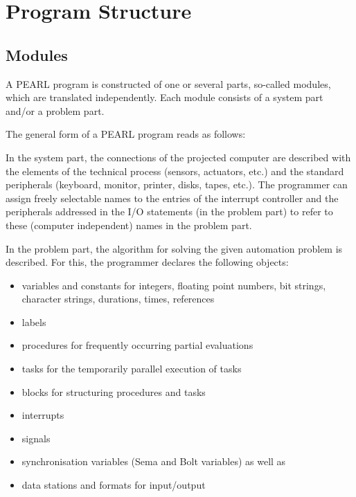 \chapter{Program Structure}   %

\section{Modules}  %
\label{sec_modules}

A PEARL program is constructed of one or several parts, so-called
modules, which are translated independently. Each module consists of a
system part and/or a problem part.

The general form of a PEARL program reads as follows:


\begin{grammarframe}



\end{grammarframe}

In the system part, the connections of the projected computer are
described with the elements of the technical process (sensors,
actuators, etc.) and the standard peripherals (keyboard, monitor,
printer, disks, tapes, etc.). The programmer can assign freely
selectable names to the entries of the interrupt controller and the
peripherals addressed in the I/O statements (in the problem part) to
refer to these (computer independent) names in the problem part.

In the problem part, the algorithm for solving the given automation
problem is described. For this, the programmer declares the following
objects:

\begin{itemize}
\item variables and constants for integers, floating point numbers, bit
strings, character strings, durations, times, references
\item labels
\item procedures for frequently occurring partial evaluations
\item tasks for the temporarily parallel execution of tasks
\item blocks for structuring procedures and tasks
\item interrupts
\item signals
\item synchronisation variables (Sema and Bolt variables) as well as
\item data stations and formats for input/output
\end{itemize}

